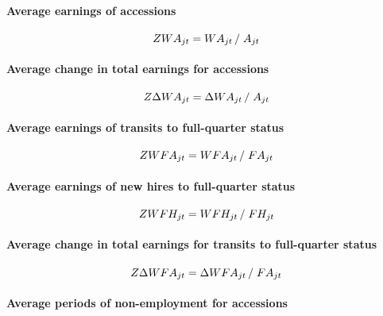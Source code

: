 \paragraph{Average earnings of accessions}

\begin{equation}
ZWA_{jt} = {WA_{jt} } \left/ {\vphantom {{WA_{jt} } {A_{jt} }}} \right. {%
A_{jt} }
\end{equation}

\paragraph{Average change in total earnings for accessions}

\begin{equation}
Z\Delta WA_{jt} = {\Delta WA_{jt} } \left/ {\vphantom {{\Delta WA_{jt} }
{A_{jt} }}} \right. {A_{jt} }
\end{equation}

\paragraph{Average earnings of transits to full-quarter status}

\begin{equation}
ZWFA_{jt}={WFA_{jt}}\left/ {\vphantom {{WFA_{jt} } {FA_{jt} }}}\right. {%
FA_{jt}}
\end{equation}

\paragraph{Average earnings of new hires to full-quarter status}

\begin{equation}
ZWFH_{jt}={WFH_{jt}}\left/ {\vphantom {{WFA_{jt} } {FA_{jt} }}}\right. {%
FH_{jt}}
\end{equation}

\paragraph{Average change in total earnings for transits to full-quarter
status}

\begin{equation}
Z\Delta WFA_{jt} = {\Delta WFA_{jt} } \left/ {\vphantom {{\Delta WFA_{jt} }
{FA_{jt} }}} \right. {FA_{jt} }
\end{equation}

\paragraph{Average periods of non-employment for accessions}


